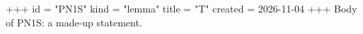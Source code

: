 +++
id = "PN1S"
kind = "lemma"
title = "T"
created = 2026-11-04
+++
Body of PN1S: a made-up statement.
